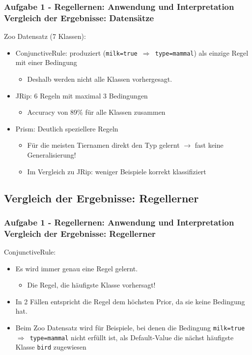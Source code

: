 \documentclass[accentcolor=tud6b,colorbacktitle,inverttitle,landscape,german,presentation,t]{tudbeamer}
\begin{document}
    \begin{frame}[t]
    \frametitle{Aufgabe 1 - Regellernen: Anwendung und Interpretation\\ Vergleich der Ergebnisse: Datensätze}
        Zoo Datensatz (7 Klassen):
        \begin{itemize}
            \item ConjunctiveRule: produziert (\texttt{milk=true $\Rightarrow$ type=mammal}) als einzige Regel mit einer Bedingung
            \begin{itemize}
                \item Deshalb werden nicht alle Klassen vorhergesagt.
            \end{itemize}
            \item JRip: 6 Regeln mit maximal 3 Bedingungen
             \begin{itemize}
                \item  Accuracy von 89\% für alle Klassen zusammen
            \end{itemize}
            \item Prism: Deutlich speziellere Regeln 
            \begin{itemize}
               \item Für die meisten Tiernamen direkt den Typ gelernt $\rightarrow$ fast keine Generalisierung!
                \item Im Vergleich zu JRip: weniger Beispiele korrekt klassifiziert
            \end{itemize}
        \end{itemize}
    \end{frame}    
   
    
    \subsection{Vergleich der Ergebnisse: Regellerner}
    
    \begin{frame}[t]
    \frametitle{Aufgabe 1 - Regellernen: Anwendung und Interpretation\\ Vergleich der Ergebnisse: Regellerner}
        ConjunctiveRule:
        \begin{itemize}
            \item Es wird immer genau eine Regel gelernt.
            \begin{itemize}
                \item  Die Regel, die häufigste Klasse vorhersagt!
            \end{itemize}
            \item In 2 Fällen entspricht die Regel dem höchsten Prior, da sie keine Bedingung hat.
            \item Beim Zoo Datensatz wird für Beispiele, bei denen die Bedingung \texttt{milk=true $\Rightarrow$ type=mammal} nicht erfüllt ist,
                  als Default-Value die nächst häufigste Klasse \texttt{bird} zugewiesen
        \end{itemize}
    \end{frame}
    
\end{document}
